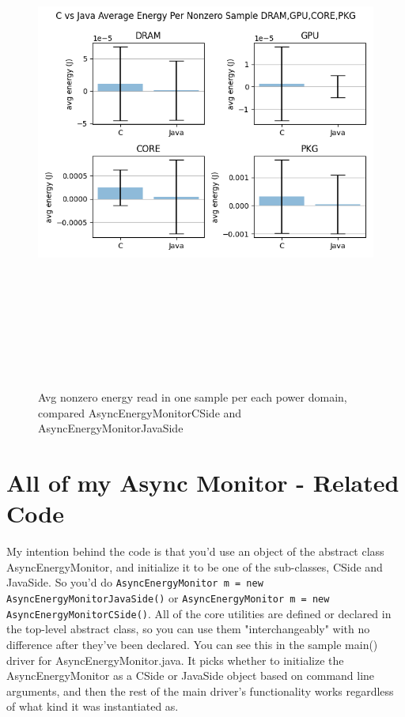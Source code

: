 \documentclass{article}
\begin{document}
    \begin{figure}[H]
    	\centering
    	\includegraphics[width=17cm,height=17cm,keepaspectratio]{AsyncMonitorCompares/avg-nonzero-energy-read.png}
    	\caption{Avg nonzero energy read in one sample per each power domain, compared AsyncEnergyMonitorCSide and AsyncEnergyMonitorJavaSide}
    	\label{fig:xalan-PKG-Time-scatter}
    \end{figure}
    
\section{All of my Async Monitor - Related Code}
    My intention behind the code is that you'd use an object of the abstract class AsyncEnergyMonitor, and initialize it to be one of the sub-classes, CSide and JavaSide. So you'd do \texttt{AsyncEnergyMonitor m = new AsyncEnergyMonitorJavaSide()} or \texttt{AsyncEnergyMonitor m = new AsyncEnergyMonitorCSide()}. All of the core utilities
    are defined or declared in the top-level abstract class, so you can use them "interchangeably" with no difference after they've been declared. You can see this
    in the sample main() driver for AsyncEnergyMonitor.java. It picks whether to initialize the AsyncEnergyMonitor as a CSide or JavaSide object based on command line arguments, and then
    the rest of the main driver's functionality works regardless of what kind it was instantiated as.
    
\end{document}
